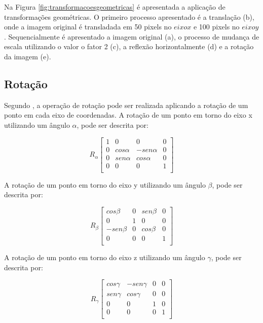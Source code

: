 \documentclass[
	12pt,				%
	oneside,			%
	a4paper,			%
	english,			%
	french,				%
	spanish,			%
	brazil,				%
	]{abntex2}
\begin{document}
Na Figura \ref{fig:transformacoesgeometricas} é apresentada a aplicação de transformações geométricas. O primeiro processo apresentado é a translação (b), onde a imagem original é transladada em 50 pixels no \(eixo x\) e 100 pixels no \(eixo y\). Sequencialmente é apresentado a imagem original (a), o processo de mudança de escala utilizando o valor o fator 2 (c), a reflexão horizontalmente (d) e a rotação da imagem (e). 

\subsection{Rotação}

Segundo \citet{pedriniSchwartz:2008}, a operação de rotação pode ser realizada aplicando a rotação de um ponto em cada eixo de coordenadas. A rotação de um ponto em torno do eixo x utilizando um ângulo \(\alpha\), pode ser descrita por:

\[
R_\alpha
\begin{bmatrix}
    1 &         0 &          0 & 0   \\ 
	0 & cos\alpha & -sen\alpha & 0   \\ 
	0 & sen\alpha &  cos\alpha & 0   \\ 
	0 &         0 &          0 & 1   \\ 
\end{bmatrix} 
\]

A rotação de um ponto em torno do eixo y utilizando um ângulo \(\beta\), pode ser descrita por:

\[
R_\beta
\begin{bmatrix}
     cos\beta & 0 & sen\beta & 0   \\ 
	        0 & 1 & 0        & 0   \\ 
	-sen\beta & 0 & cos\beta & 0   \\ 
            0 & 0 &        0 & 1   \\ 
\end{bmatrix} 
\]

A rotação de um ponto em torno do eixo z utilizando um ângulo \(\gamma\), pode ser descrita por:

\[
R_\gamma
\begin{bmatrix}
    cos\gamma & -sen\gamma & 0 & 0   \\ 
	sen\gamma &  cos\gamma & 0 & 0   \\ 
	        0 &          0 & 1 & 0   \\ 
            0 &          0 & 0 & 1   \\ 
\end{bmatrix} 
\]
\end{document}
